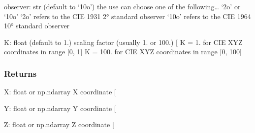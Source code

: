 \documentclass[letterpaper,10pt,english]{sphinxmanual}
\begin{document}
\begin{fulllineitems}
\sphinxAtStartPar
observer: str (default to ‘10o’)
the use can choose one of the following… ‘2o’ or ‘10o’
‘2o’ refers to the CIE 1931 2° standard observer
‘10o’ refers to the CIE 1964 10° standard observer

\sphinxAtStartPar
K: float (default to 1.)
scaling factor (usually 1. or 100.) {[}\sphinxhyphen{}{]}
K = 1. for CIE XYZ coordinates in range {[}0, 1{]}
K = 100. for CIE XYZ coordinates in range {[}0, 100{]}


\subsubsection{Returns}
\label{\detokenize{07_colors:id18}}
\sphinxAtStartPar
X: float or np.ndarray
X coordinate {[}\sphinxhyphen{}{]}

\sphinxAtStartPar
Y: float or np.ndarray
Y coordinate {[}\sphinxhyphen{}{]}

\sphinxAtStartPar
Z: float or np.ndarray
Z coordinate {[}\sphinxhyphen{}{]}

\end{fulllineitems}

\end{document}

